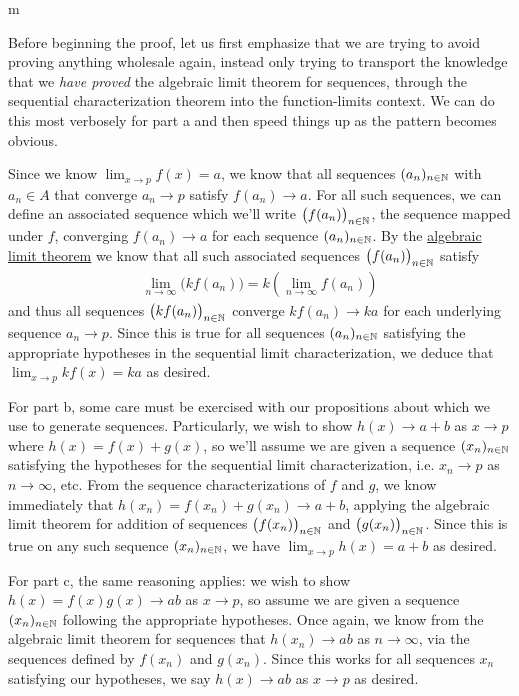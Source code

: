 \documentclass[11pt]{article}
\begin{document}
\begin{my proof}{m}

Before beginning the proof, let us first emphasize that we are trying to avoid proving anything wholesale again, instead only trying to transport the knowledge that we \emph{have proved} the algebraic limit theorem for sequences, through the sequential characterization theorem into the function-limits context. We can do this most verbosely for part a and then speed things up as the pattern becomes obvious.

Since we know $\lim_{x \to p} f(x) = a$, we know that all sequences $(a_n)_{n \in \mathbb{N}}$ with $a_n \in A$ that converge $a_n \to p$ satisfy $f(a_n) \to a$. For all such sequences, we can define an associated sequence which we'll write $\big( f(a_n) \big)_{n\in \mathbb{N}}$, the sequence mapped under $f$, converging $f(a_n) \to a$ for each sequence $(a_n)_{n\in \mathbb{N}}$. By the \hyperref[thm:AlgebraicLimitTheoremSequences]{algebraic limit theorem} we know that all such associated sequences $\big( f(a_n)\big)_{n\in \mathbb{N}}$ satisfy \begin{gather*}
\lim_{n \to \infty} \big(k f(a_n)\big) = k \left( \lim_{n\to \infty} f(a_n) \right)
\end{gather*} 
and thus all sequences $\big( k f (a_n)\big)_{n \in \mathbb{N}}$ converge $k f(a_n) \to ka$ for each underlying sequence $a_n \to p$. Since this is true for all sequences $(a_n)_{n\in \mathbb{N}}$ satisfying the appropriate hypotheses in the sequential limit characterization, we deduce that $\lim_{x \to p} k f(x) = k a$ as desired.

For part b, some care must be exercised with our propositions about which  we use to generate sequences. Particularly, we wish to show $h(x) \to a + b$ as $x \to p$ where $h(x) = f(x) + g(x)$, so we'll assume we are given a sequence $(x_n)_{n \in \mathbb{N}}$ satisfying the hypotheses for the sequential limit characterization, i.e. $x_n \to p$ as $n\to \infty$, etc. From the sequence characterizations of $f$ and $g$, we know immediately that $h(x_n) = f(x_n) + g(x_n) \to a + b$, applying the algebraic limit theorem for addition of sequences $\big(f(x_n) \big)_{n \in \mathbb{N}}$ and $\big( g(x_n) \big)_{n\in \mathbb{N}}$. Since this is true on any such sequence $(x_n)_{n\in \mathbb{N}}$, we have $\lim_{x \to p}h(x) = a + b$ as desired.

For part c, the same reasoning applies: we wish to show $h(x) = f(x) g(x) \to ab$ as $x \to p$, so assume we are given a sequence $(x_n)_{n \in \mathbb{N}}$ following the appropriate hypotheses. Once again, we know from the algebraic limit theorem for sequences that $h(x_n) \to ab$ as $n \to \infty$, via the sequences defined by $f(x_n)$ and $g(x_n)$. Since this works for all sequences $x_n$ satisfying our hypotheses, we say $h(x) \to ab$ as $x \to p$ as desired.


\end{my proof}
\end{document}
